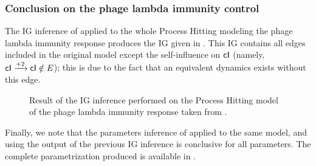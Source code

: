 \subsubsection{Conclusion on the phage lambda immunity control}

The IG inference of  applied to the whole Process Hitting modeling
the phage lambda immunity response produces the IG given in .
This IG contains all edges included in the original model except the
self-influence on $\mathsf{cI}$ (namely, $\mathsf{cI} \xrightarrow{+ 2} \mathsf{cI} \notin E$);
this is due to the fact that an equivalent dynamics exists without this edge.

\begin{figure}
\centering
{}
\caption{\label{fig:phage-lambda-ig}%
  Result of the IG inference performed on the Process Hitting model
  of the phage lambda immunity response
  taken from \cite{thieffry_dynamical_1995}.
}
\end{figure}

Finally, we note that the parameters inference of  applied to the same model,
and using the output of the previous IG inference is conclusive for all parameters.
The complete parametrization produced is available in .


